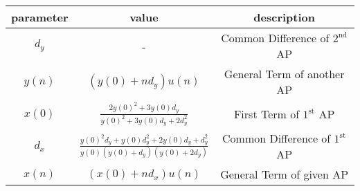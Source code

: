 
  \centering
  \begin{tabular}{|c|c|c|}
  \hline
    parameter & value & description \\
    \hline
    $d_y$ & - & Common Difference of $2^\text{nd}$ AP \\
    \hline 
    $y(n)$ & $(y(0) + nd_y)u(n)$ & General Term of another AP \\
    \hline
    $x(0)$ & $\frac{2y(0)^2 + 3y(0)d_y}{y(0)^2 + 3y(0)d_y + 2d_y^2}$ & First Term of $1^\text{st}$ AP \\
    \hline
    $d_x$ & $\frac{y(0)^2d_y + y(0)d_y^2 + 2y(0)d_y + d_y^2}{y(0)(y(0) + d_y)(y(0) + 2d_y)}$ & Common Difference of $1^\text{st}$ AP \\
    \hline
    $x(n)$ & $(x(0) + nd_x)u(n)$ & General Term of given AP \\
    \hline
  \end{tabular}

